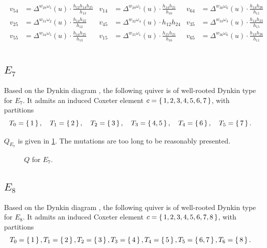 \documentclass{amsart}
\theoremstyle{plain}
\theoremstyle{definition}
\theoremstyle{remark}
\newcommand{\fundamentalweight}{\omega}
\newcommand{\genminor}[2]{\Delta^{{#1} \fundamentalweight_{#2}}}
\newcommand{\inldynkinEseven}{\raisebox{-0.7ex}{}}
\newcommand{\inldynkinEeight}{\raisebox{-0.7ex}{}}
\begin{document}
\begin{equation*}
\begin{gathered}
\begin{aligned}
        v_{5 4} &= \genminor{w_{28}}{5}(u) \cdot \frac{h_{12} h_{14} h_{25} }{h_{13}} & v_{1 4} &= \genminor{w_{29}}{1}(u) \cdot \frac{h_{14} h_{21} }{h_{16}} & v_{6 4} &= \genminor{w_{30}}{6}(u) \cdot \frac{h_{14} h_{26} }{h_{11}} \\
        v_{2 5} &= \genminor{w_{31}}{2}(u) \cdot \frac{h_{14} h_{22} }{h_{12}} & v_{4 5} &= \genminor{w_{32}}{4}(u) \cdot h_{12} h_{24} & v_{3 5} &= \genminor{w_{33}}{3}(u) \cdot \frac{h_{14} h_{23} }{h_{15}} \\
        v_{5 5} &= \genminor{w_{34}}{5}(u) \cdot \frac{h_{14} h_{25} }{h_{13}} & v_{1 5} &= \genminor{w_{35}}{1}(u) \cdot \frac{h_{15} h_{21} }{h_{16}} & v_{6 5} &= \genminor{w_{36}}{6}(u) \cdot \frac{h_{13} h_{26} }{h_{11}} \\
      \end{aligned}
    \end{gathered}
  \end{equation*}

  \subsection{\texorpdfstring{$E_7$}{E\_7}}

  Based on the Dynkin diagram \inldynkinEseven, the following quiver is
  of well-rooted Dynkin type for $E_7$. It admits an induced Coxeter
  element $c = \set{1, 2, 3, 4, 5, 6, 7}$, with partitions \[ T_0 =
    \set{1}, \quad T_1 = \set{2}, \quad T_2 = \set{3}, \quad T_3 =
    \set{4, 5}, \quad T_4 = \set{6}, \quad T_5 = \set{7}. \]

  {\centering 

  } $Q_{E_7}$ is given in \cref{fig:QE7}. The mutations are too long to
  be reasonably presented.

  \begin{figure}
    \centering 

    \caption{$Q$ for $E_7$.
      \label{fig:QE7}
    }
  \end{figure}

  \subsection{\texorpdfstring{$E_8$}{E\_8}}

  Based on the Dynkin diagram \inldynkinEeight, the following quiver is
  of well-rooted Dynkin type for $E_8$. It admits an induced Coxeter
  element $c = \set{1, 2, 3, 4, 5, 6, 7, 8}$, with partitions \[ T_0 =
    \set{1}, T_1 = \set{2}, T_2 = \set{3}, T_3 = \set{4}, T_4 = \set{5},
    T_5 = \set{6, 7}, T_6 = \set{8}. \]
\end{document}
